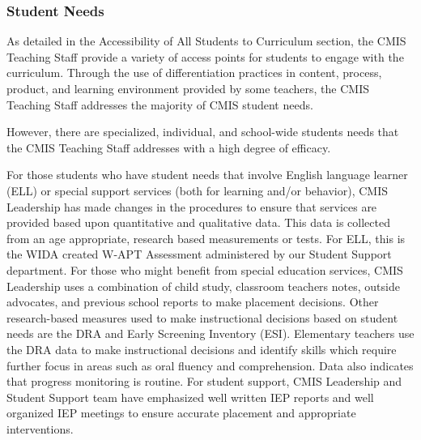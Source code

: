 \subsubsection{Student Needs}



\begin{findings}
As detailed in the Accessibility of All Students to Curriculum section, the CMIS Teaching Staff provide a variety of access points for students to engage with the curriculum. Through the use of differentiation practices in content, process, product, and learning environment provided by some teachers, the CMIS Teaching Staff addresses the majority of CMIS student needs. 


However, there are specialized, individual, and school-wide students needs that the CMIS Teaching Staff addresses with a high degree of efficacy. 


For those students who have student needs that involve English language learner (ELL) or special support services (both for learning and/or behavior), CMIS Leadership has made changes in the procedures to ensure that services are provided based upon quantitative and qualitative data. This data is collected from an age appropriate, research based measurements or  tests.  For ELL, this is the WIDA created W-APT Assessment administered by our Student Support department. For those who might benefit from special education services, CMIS Leadership uses a combination of child study, classroom teachers notes, outside advocates, and previous school reports to make placement decisions. Other research-based measures used to make instructional decisions based on student needs are the DRA and  Early Screening Inventory (ESI). Elementary teachers use the DRA data to make instructional decisions and identify skills which require further focus in areas such as oral fluency and comprehension. Data also indicates that progress monitoring is routine. For student support, CMIS Leadership and Student Support team have emphasized well written IEP reports and well organized IEP meetings to ensure accurate placement and appropriate interventions. 


\end{findings}
